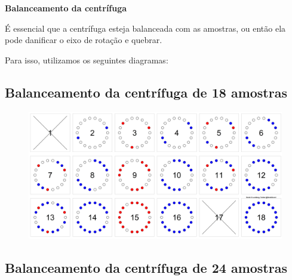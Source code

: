 \documentclass[
  letterpaper,
  DIV=11,
  numbers=noendperiod]{scrreprt}
\begin{document}
\begin{tcolorbox}[enhanced jigsaw, colback=white, toprule=.15mm, rightrule=.15mm, opacityback=0, left=2mm, arc=.35mm, bottomrule=.15mm, breakable, leftrule=.75mm]
\begin{minipage}[t]{5.5mm}
\textcolor{quarto-callout-caution-color}{\faFire}
\end{minipage}%
\begin{minipage}[t]{\textwidth - 5.5mm}

\textbf{Balanceamento da centrífuga}\vspace{2mm}

É essencial que a centrífuga esteja balanceada com as amostras, ou então
ela pode danificar o eixo de rotação e quebrar.

Para isso, utilizamos os seguintes diagramas:

\hypertarget{balanceamento-da-centruxedfuga-de-18-amostras}{%
\subsection{Balanceamento da centrífuga de 18
amostras}\label{balanceamento-da-centruxedfuga-de-18-amostras}}

\begin{figure}[H]

{\centering \includegraphics{figures/equipamentos/balanceamento_18.png}

}

\end{figure}

\hypertarget{balanceamento-da-centruxedfuga-de-24-amostras}{%
\subsection{Balanceamento da centrífuga de 24
amostras}\label{balanceamento-da-centruxedfuga-de-24-amostras}}


\end{minipage}
\end{tcolorbox}
\end{document}
